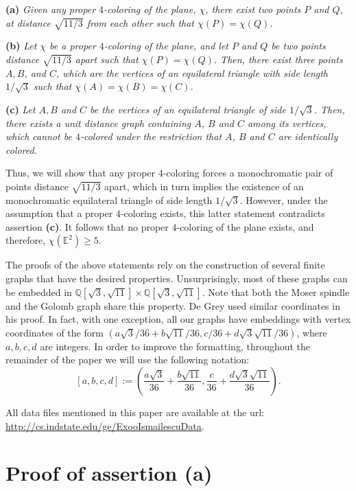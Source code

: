 \documentclass [11pt,oneside]{amsart}
\theoremstyle{definition}
\theoremstyle{plain}
\newcommand{\exoonote}[1] {
	{\color{red}{{\tt [Comment: }{#1}]}}
}
\begin{document}
{\bf  (a)} \emph{Given any proper $4$-coloring of the plane, $\chi$, there exist two points $P$ and $Q$, at distance $\sqrt{11/3}$ from each other such that $\chi(P)=\chi(Q)$.}

{\bf  (b)} \emph{Let $\chi$ be a proper $4$-coloring of the plane, and let $P$ and $Q$ be two points distance $\sqrt{11/3}$ apart such that $\chi(P)=\chi(Q)$. Then, there exist three points $A, B$, and $C$, which are the vertices of an equilateral triangle with side length $1/\sqrt{3}$ such that $\chi(A)=\chi(B)=\chi(C)$.}

{\bf (c)} \emph{Let $A, B$ and $C$ be the vertices of an equilateral triangle of side $1/\sqrt{3}$. Then, there exists a unit distance graph containing $A$, $B$ and $C$ among its vertices, which cannot be $4$-colored under the restriction that $A$, $B$ and $C$ are identically colored.}

Thus, we will show that any proper $4$-coloring forces a monochromatic pair of points distance $\sqrt{11/3}$ apart, which in turn implies the existence of an monochromatic equilateral triangle of side length $1/\sqrt{3}$. However, under the assumption that a proper $4$-coloring exists, this latter statement contradicts assertion {\bf (c)}. It follows that no proper $4$-coloring of the plane exists, and therefore, $\chi(\mathbb{E}^2)\ge 5$.

The proofs of the above statements rely on the construction of several finite graphs that have the desired properties. Unsurprisingly, most of these graphs can be embedded
in $\mathbb{Q}[\sqrt{3},\sqrt{11}]\times \mathbb{Q}[\sqrt{3},\sqrt{11}] $. Note that both the Moser spindle and the Golomb graph share this property. De Grey used similar coordinates in his proof.
In fact, with one exception, all our graphs have embeddings with vertex coordinates of the form $(a\sqrt{3}/36+b\sqrt{11}/36, c/36+d\sqrt{3}\sqrt{11}/36)$, where $a, b, c, d$ are integers. In order to improve the formatting, throughout the remainder of the paper we will use the following notation:
\begin{equation}\label{notation}
[a,b,c,d]:=\left(\frac{a\sqrt{3}}{36}+\frac{b\sqrt{11}}{36}, \frac{c}{36}+\frac{d\sqrt{3}\sqrt{11}}{36}\right).
\end{equation}


All data files mentioned in this paper are available
at the url: \url{http://cs.indstate.edu/ge/ExooIsmailescuData}.

\section{\bf Proof of assertion (a)}
\end{document}
